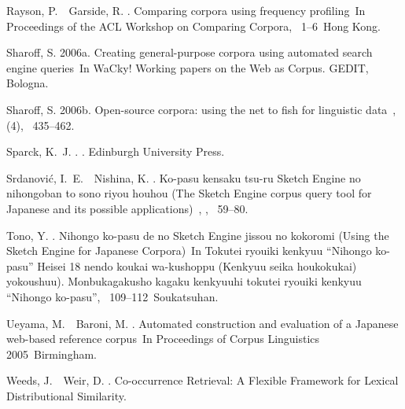 \documentclass[english]{jnlp_1.4}
\begin{document}
\begin{thebibliography}{}
Rayson, P.\BBACOMMA\ \BBA\ Garside, R. \BBCP.
\newblock \BBOQ Comparing corpora using frequency profiling\BBCQ\
\newblock In {\Bem Proceedings of the ACL Workshop on Comparing Corpora},
  \mbox{\BPGS\ 1--6}\ Hong Kong.

Sharoff, S. \BBOP 2006a\BBCP.
\newblock \BBOQ Creating general-purpose corpora using automated search engine
  queries\BBCQ\
\newblock In {\Bem WaCky! Working papers on the Web as Corpus}. GEDIT, Bologna.

Sharoff, S. \BBOP 2006b\BBCP.
\newblock \BBOQ Open-source corpora: using the net to fish for linguistic
  data\BBCQ\
, {}  (4),
  \mbox{\BPGS\ 435--462}.

Sparck, K.~J. \BBOP 1986\BBCP.
.
\newblock Edinburgh University Press.

Srdanovi\'c, I.~E.\BBACOMMA\ \BBA\ Nishina, K. \BBCP.
\newblock \BBOQ Ko-pasu kensaku tsu-ru Sketch Engine no nihongoban to sono
  riyou houhou (The Sketch Engine corpus query tool for Japanese and its
  possible applications)\BBCQ\
, {}, \mbox{\BPGS\
  59--80}.

\bibitem[\protect\BCAY{Tono}{Tono}{2007}]{Tono_2007}
Tono, Y. \BBOP 2007\BBCP.
\newblock \BBOQ Nihongo ko-pasu de no Sketch Engine jissou no kokoromi (Using
  the Sketch Engine for Japanese Corpora)\BBCQ\
\newblock In {\Bem Tokutei ryouiki kenkyuu ``Nihongo ko-pasu'' Heisei 18 nendo
  koukai wa-kushoppu (Kenkyuu seika houkokukai) yokoushuu). Monbukagakusho
  kagaku kenkyuuhi tokutei ryouiki kenkyuu ``Nihongo ko-pasu''}, \mbox{\BPGS\
  109--112}\ Soukatsuhan.

Ueyama, M.\BBACOMMA\ \BBA\ Baroni, M. \BBCP.
\newblock \BBOQ Automated construction and evaluation of a Japanese web-based
  reference corpus\BBCQ\
\newblock In {\Bem Proceedings of Corpus Linguistics 2005}\ Birmingham.

Weeds, J.\BBACOMMA\ \BBA\ Weir, D. \BBOP 2005\BBCP.
\newblock \BBOQ Co-occurrence Retrieval: A Flexible Framework for Lexical
  Distributional Similarity\BBCQ.

\end{thebibliography}
\end{document}
